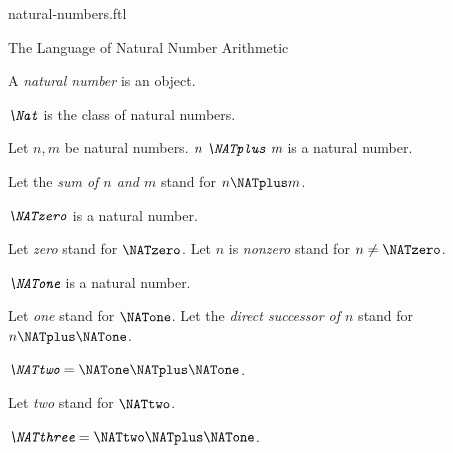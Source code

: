 \documentclass{stex}
\begin{document}
\begin{smodule}{natural-numbers.ftl}

\begin{sfragment}{The Language of Natural Number Arithmetic}
  \begin{signature}[forthel,id=ARITHMETIC_01_3074681254969344]
    A \emph{natural number} is an object.
  \end{signature}

  \begin{definition}[forthel,id=ARITHMETIC_01_7367148418629632]
    $\emph{\Nat}$ is the class of natural numbers.
  \end{definition}

  \begin{signature}[forthel,id=ARITHMETIC_01_1567933815848960]
    Let $n, m$ be natural numbers.
    $\emph{n \NATplus m}$ is a natural number.

    Let the \emph{sum of $n$ and $m$} stand for $n \NATplus m$.
  \end{signature}

  \begin{signature}[forthel,id=ARITHMETIC_01_7633304715001856]
    $\emph{\NATzero}$ is a natural number.

    Let \emph{zero} stand for $\NATzero$.
    Let $n$ is \emph{nonzero} stand for $n \neq \NATzero$.
  \end{signature}

  \begin{signature}[forthel,id=ARITHMETIC_01_1200254566985232]
    $\emph{\NATone}$ is a natural number.

    Let \emph{one} stand for $\NATone$.
    Let the \emph{direct successor of $n$} stand for $n \NATplus \NATone$.
  \end{signature}

  \begin{definition}[forthel,id=ARITHMETIC_01_4584236572999680]
    $\emph{\NATtwo} = \NATone \NATplus \NATone$.

    Let \emph{two} stand for $\NATtwo$.
  \end{definition}

  \begin{definition}[forthel,id=ARITHMETIC_01_3836725109456896]
    $\emph{\NATthree} = \NATtwo \NATplus \NATone$.


\end{definition}
\end{sfragment}
\end{smodule}
\end{document}
